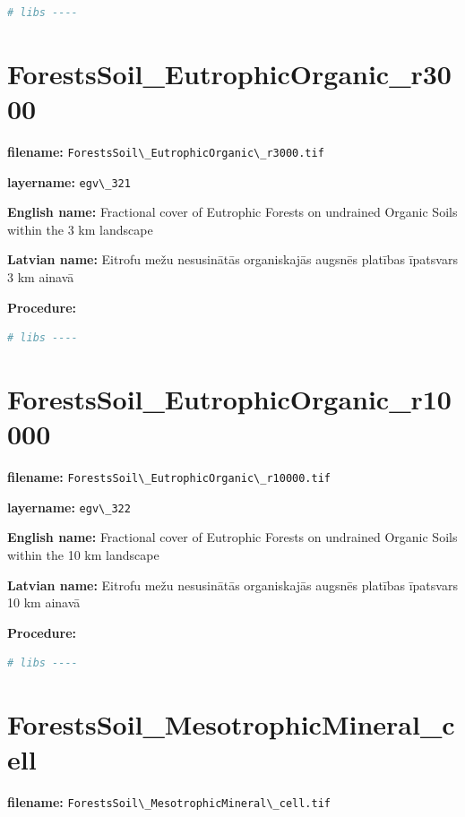 \documentclass[
]{book}
\newcommand{\passthrough}[1]{#1}
\begin{document}
\begin{lstlisting}[language=R]
# libs ----
\end{lstlisting}

\section{ForestsSoil\_EutrophicOrganic\_r3000}\label{ch06.321}

\textbf{filename:} \passthrough{\lstinline!ForestsSoil\_EutrophicOrganic\_r3000.tif!}

\textbf{layername:} \passthrough{\lstinline!egv\_321!}

\textbf{English name:} Fractional cover of Eutrophic Forests on undrained Organic Soils within the 3 km landscape

\textbf{Latvian name:} Eitrofu mežu nesusinātās organiskajās augsnēs platības īpatsvars 3 km ainavā

\textbf{Procedure:}

\begin{lstlisting}[language=R]
# libs ----
\end{lstlisting}

\section{ForestsSoil\_EutrophicOrganic\_r10000}\label{ch06.322}

\textbf{filename:} \passthrough{\lstinline!ForestsSoil\_EutrophicOrganic\_r10000.tif!}

\textbf{layername:} \passthrough{\lstinline!egv\_322!}

\textbf{English name:} Fractional cover of Eutrophic Forests on undrained Organic Soils within the 10 km landscape

\textbf{Latvian name:} Eitrofu mežu nesusinātās organiskajās augsnēs platības īpatsvars 10 km ainavā

\textbf{Procedure:}

\begin{lstlisting}[language=R]
# libs ----
\end{lstlisting}

\section{ForestsSoil\_MesotrophicMineral\_cell}\label{ch06.323}

\textbf{filename:} \passthrough{\lstinline!ForestsSoil\_MesotrophicMineral\_cell.tif!}
\end{document}

